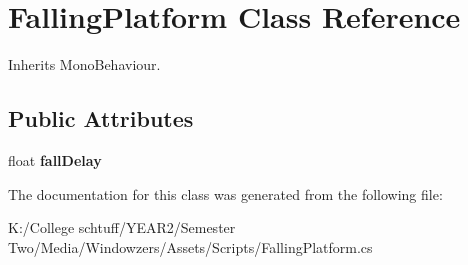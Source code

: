 \hypertarget{class_falling_platform}{}\section{Falling\+Platform Class Reference}
\label{class_falling_platform}


Inherits Mono\+Behaviour.

\subsection*{Public Attributes}
\begin{DoxyCompactItemize}
\item 
\mbox{\label{class_falling_platform_aa2e523a6580713f21832f994b2b30663}} 
float {\bfseries fall\+Delay}
\end{DoxyCompactItemize}


The documentation for this class was generated from the following file\+:\begin{DoxyCompactItemize}
\item 
K\+:/\+College schtuff/\+Y\+E\+A\+R2/\+Semester Two/\+Media/\+Windowzers/\+Assets/\+Scripts/Falling\+Platform.\+cs\end{DoxyCompactItemize}
